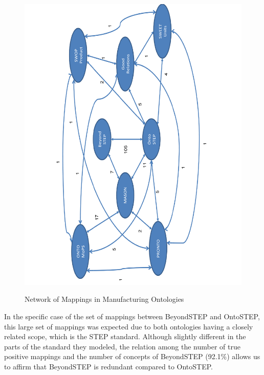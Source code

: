\begin{figure}
	\begin{center}
		\includegraphics[scale=0.8]{figure-chapterIV/fig4-10}\\
		\caption{Network of Mappings in Manufacturing Ontologies}
		\label{figure4-10}
	\end{center}
\end{figure}



In the specific case of the set of mappings between BeyondSTEP and OntoSTEP, this large set of mappings was expected due to both ontologies having a closely related scope, which is the STEP standard. Although slightly different in the parts of the standard they modeled, the relation among the number of true positive mappings and the number of concepts of BeyondSTEP (92.1\%) allows us to affirm that BeyondSTEP is redundant compared to OntoSTEP.

